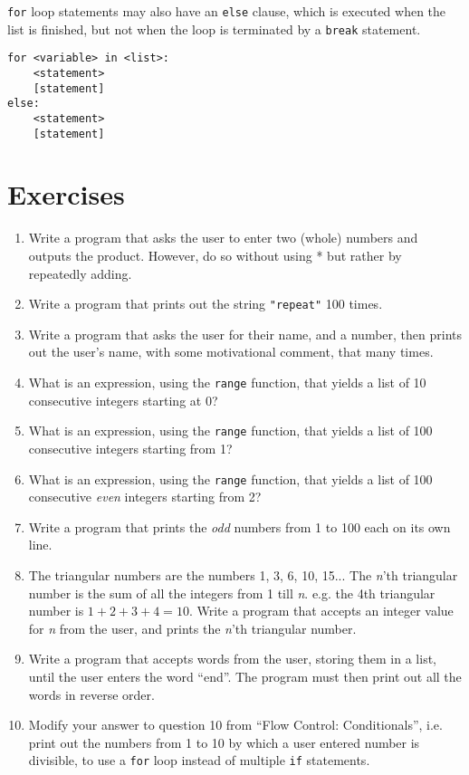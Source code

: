 \texttt{for} loop statements may also have an \texttt{else} clause, which is   executed when the list is finished, but not when the loop is   terminated by a \texttt{break} statement.
\begin{lstlisting}
for <variable> in <list>:
    <statement>
    [statement]
else:
    <statement>
    [statement]
\end{lstlisting}

\section{Exercises}
\begin{enumerate}
	\item Write a program that asks the user to enter two (whole) numbers and outputs the product. However, do so without using * but rather by repeatedly adding.
	\item Write a program that prints out the string \texttt{"repeat"} 100 times.
	\item Write a program that asks the user for their name, and a    number, then prints out the user's name, with some motivational comment, that many times.
	\item What is an expression, using the \texttt{range} function, that yields a    list of 10 consecutive integers starting at 0?
	\item What is an expression, using the \texttt{range} function, that yields a    list of 100 consecutive integers starting from 1?
	\item What is an expression, using the \texttt{range} function, that yields a    list of 100 consecutive \textit{even} integers starting    from 2?
	\item Write a program that prints the \textit{odd} numbers from 1 to 100 each on    its own line.
	\item The triangular numbers are the numbers 1, 3, 6, 10, 15... The \textit{n}'th triangular number is the sum of all the integers from 1 till \textit{n}. e.g. the 4th triangular number is $1+2+3+4=10$. Write a program that accepts an integer value for \textit{n} from the user, and prints the \textit{n}'th triangular number.
	\item Write a program that accepts words from the user, storing them in a list, until the user enters the word ``end''. The program must then print out all the words in reverse order.
	\item Modify your answer to question 10 from ``Flow Control:    Conditionals'', i.e. print out the numbers from 1 to 10 by which a    user entered number is divisible, to use a \texttt{for} loop instead of    multiple \texttt{if} statements.

\end{enumerate}
